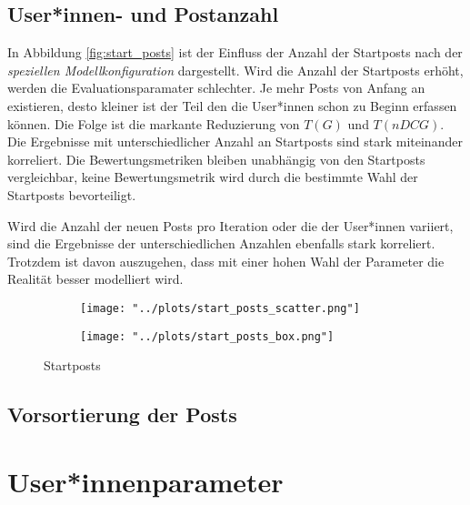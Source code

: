 \subsection{User*innen- und Postanzahl}

In Abbildung \ref{fig:start_posts} ist der Einfluss der Anzahl der Startposts nach der \textit{speziellen Modellkonfiguration} dargestellt. Wird die Anzahl der Startposts erhöht, werden die Evaluationsparamater schlechter. Je mehr Posts von Anfang an existieren, desto kleiner ist der Teil den die User*innen schon zu Beginn erfassen können. Die Folge ist die markante Reduzierung von $T(G)$ und $T(nDCG)$. Die Ergebnisse mit unterschiedlicher Anzahl an Startposts sind stark miteinander korreliert. Die Bewertungsmetriken bleiben unabhängig von den Startposts vergleichbar, keine Bewertungsmetrik wird durch die bestimmte Wahl der Startposts bevorteiligt.

Wird die Anzahl der neuen Posts pro Iteration oder die der User*innen variiert, sind die Ergebnisse der unterschiedlichen Anzahlen ebenfalls stark korreliert. Trotzdem ist davon auszugehen, dass mit einer hohen Wahl der Parameter die Realität besser modelliert wird.

\begin{figure}[!h]
	\label{fig:start_posts}	
	\begin{subfigure}{0.5\textwidth}
		\texttt{[image: "../plots/start\_posts\_scatter.png"]}
	\end{subfigure}
	\begin{subfigure}{0.5\textwidth}
		\texttt{[image: "../plots/start\_posts\_box.png"]}
	\end{subfigure}
	\caption{Startposts}
\end{figure}


\subsection{Vorsortierung der Posts}





\section{User*innenparameter}

